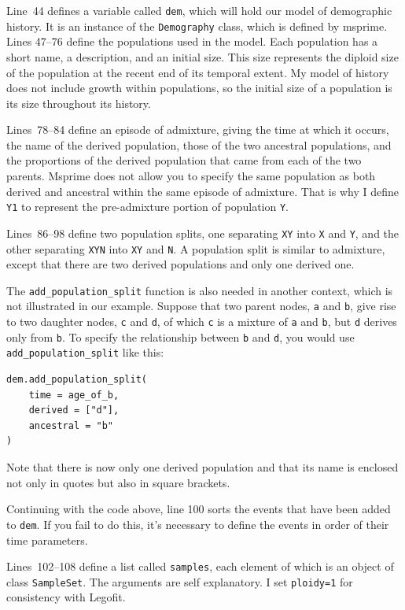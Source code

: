 \documentclass[11pt]{article}
\begin{document}
Line~44 defines a variable called \texttt{dem}, which will hold our
model of demographic history. It is an instance of the
\texttt{Demography} class, which is defined by msprime. Lines 47--76
define the populations used in the model. Each population has a short
name, a description, and an initial size. This size represents the
diploid size of the population at the recent end of its temporal
extent. My model of history does not include growth within
populations, so the initial size of a population is its size
throughout its history.

Lines~78--84 define an episode of admixture, giving the time at which
it occurs, the name of the derived population, those of the two
ancestral populations, and the proportions of the derived population
that came from each of the two parents. Msprime does not allow you to
specify the same population as both derived and ancestral within the
same episode of admixture. That is why I define \texttt{Y1} to
represent the pre-admixture portion of population \texttt{Y}.

Lines~86--98 define two population splits, one separating \texttt{XY}
into \texttt{X} and \texttt{Y}, and the other separating \texttt{XYN}
into \texttt{XY} and \texttt{N}. A population split is similar to
admixture, except that there are two derived populations and only one
derived one.

The \verb|add_population_split| function is also needed in another
context, which is not illustrated in our example. Suppose that two
parent nodes, \texttt{a} and \texttt{b}, give rise to two daughter
nodes, \texttt{c} and \texttt{d}, of which \texttt{c} is a mixture of
\texttt{a} and \texttt{b}, but \texttt{d} derives only from
\texttt{b}. To specify the relationship between \texttt{b} and
\texttt{d}, you would use \verb|add_population_split| like this:
\begin{verbatim}
dem.add_population_split(
    time = age_of_b,
    derived = ["d"],
    ancestral = "b"
)
\end{verbatim}
Note that there is now only one derived population and that its name
is enclosed not only in quotes but also in square brackets.

Continuing with the code above, line 100 sorts the events that have
been added to \texttt{dem}. If you fail to do this, it's necessary to
define the events in order of their time parameters.

Lines~102--108 define a list called \texttt{samples}, each element of
which is an object of class \texttt{SampleSet}. The arguments are self
explanatory. I set \texttt{ploidy=1} for consistency with Legofit.
\end{document}
